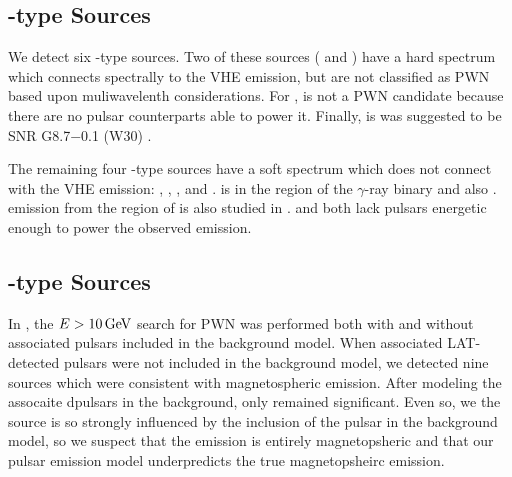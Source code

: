 \subsection{\OtherClass-type Sources}

We detect six \OtherClass-type sources.  Two of these sources
( and ) have a hard spectrum which connects
spectrally to the \ac{VHE} emission, but are not classified as \ac{PWN}
based upon muliwavelenth considerations.  For , is not a
\ac{PWN} candidate because there are no pulsar counterparts able to
power it.  Finally,  is was suggested to be SNR G8.7$-$0.1
(W30) \citep{ajello_2012a_fermi-large}.

The remaining four \OtherClass-type sources have a soft spectrum
which does not connect with the \ac{VHE} emission: ,
, , and .  
is in the region of the $\gamma$-ray binary 
\citep{the-fermi-lat-collaboration_2012a_periodic-emission} and also
.  \gev emission from the region of  is also
studied in \cite{domainko_2012a_exploring-nature}.   and
 both lack pulsars energetic enough to power the observed
emission.



\subsection{\PSRClass-type Sources}

In \citep{acero_2013a_constraints-galactic}, the
$E>10\,\text{GeV}$ search for \ac{PWN} was performed both with
and without associated pulsars included in the background model.  When
associated \ac{LAT}-detected pulsars were not included in the background
model, we detected nine sources which were consistent with magnetospheric
emission.  After modeling the assocaite dpulsars in the background, only
 remained significant.  Even so, we the source is so strongly
influenced by the inclusion of the pulsar in the background model, so
we suspect that the emission is entirely magnetopsheric and that our
pulsar emission model underpredicts the true magnetopsheirc emission.
